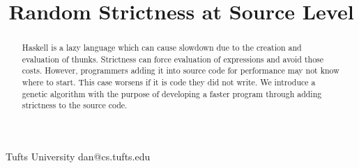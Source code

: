 \documentclass[preprint,nocopyrightspace]{sigplanconf}
\begin{document}
\lstset{language=Haskell,basicstyle=\ttfamily,captionpos=b}

\setlength{\pdfpageheight}{\paperheight}
\setlength{\pdfpagewidth}{\paperwidth}





\title{Random Strictness at Source Level}

           {Tufts University}
           {dan@cs.tufts.edu}

\maketitle
\thispagestyle{plain}
\pagestyle{plain}
\begin{abstract}
Haskell is a lazy language which can cause slowdown due to the creation and evaluation of thunks. Strictness can force evaluation of expressions and avoid those costs. However, programmers adding it into source code for performance may not know where to start. This case worsens if it is code they did not write. We introduce a genetic algorithm with the purpose of developing a faster program through adding strictness to the source code.
\end{abstract}


\end{document}
